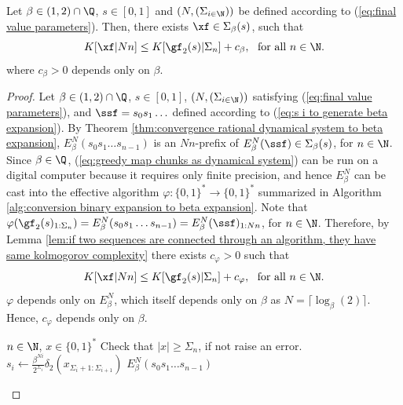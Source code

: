 \begin{lemma}\label{lem:weak inequality binary beta expansion Kolmogorov rational}
	Let $\beta \in (1,2)\cap \Q$, $s \in [0,1]$ and $(N,(\Sigma_{i \in \N}))$ be defined according to (\ref{eq:final value parameters}). Then, there exists $\xf \in \Sigma_\beta(s)$, such that
	\begin{equation}
		K[\xf|N n] \leq K[\gf_2(s)|\Sigma_n] + c_\beta, \ \ \text{for all} \ n \in \N.
	\end{equation}
	where $c_\beta > 0$ depends only on $\beta$.
\end{lemma}
\begin{proof}
	Let $\beta \in (1,2)\cap \Q$, $s \in [0,1]$, $(N,(\Sigma_{i \in \N}))$ satisfying (\ref{eq:final value parameters}), and $\ssf = s_0s_1\ldots$ defined according to (\ref{eq:s i to generate beta expansion}). By Theorem \ref{thm:convergence rational dynamical system to beta expansion}, $E_\beta^N(s_0s_1\ldots s_{n-1})$ is an $Nn$-prefix of $E_\beta^N(\ssf) \in \Sigma_\beta(s)$, for $n \in \N$. Since $\beta \in \Q$, (\ref{eq:greedy map chunks as dynamical system}) can be run on a digital computer because it requires only finite precision, and hence $E_\beta^N$ can be cast into the effective algorithm $\varphi : \{0,1\}^\ast \to \{0,1\}^\ast$ summarized in Algorithm \ref{alg:conversion binary expansion to beta expansion}. Note that $\varphi(\gf_2(s)_{1:\Sigma_n}) = E_\beta^N(s_0s_1\ldots s_{n-1}) = E_\beta^N(\ssf)_{1:Nn}$, for $n \in \N$. Therefore, by Lemma \ref{lem:if two sequences are connected through an algorithm, they have same kolmogorov complexity} there exists $c_\varphi > 0$ such that
	\begin{equation}
		K[\xf|N n] \leq K[\gf_2(s)|\Sigma_n] + c_\varphi, \ \ \text{for all} \ n \in \N.
	\end{equation}
	$\varphi$ depends only on $E_\beta^N$, which itself depends only on $\beta$ as $N = \lceil \log_\beta(2) \rceil$. Hence, $c_\varphi$ depends only on $\beta$.
	\begin{algorithm}[H]
		\caption{$\beta$-expansion from a binary expansion}\label{alg:conversion binary expansion to beta expansion}
		\begin{algorithmic}[1]
			\Require $n \in \N$, $x \in \{0,1\}^\ast$
			\State Check that $|x| \geq \Sigma_n$, if not raise an error.
			\State $s_i \gets \frac{\beta^{Ni}}{2^{\Sigma_i}}\delta_2(x_{\Sigma_i+1:\Sigma_{i+1}})$
			\EndFor
			\State \Return $E_\beta^N(s_0s_1\ldots s_{n-1})$
		\end{algorithmic}
	\end{algorithm}
\end{proof}

